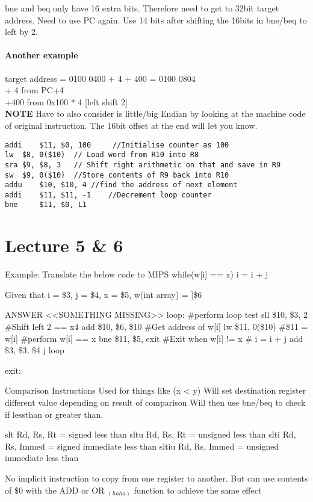 \documentclass{article}
\newcommand\tab[1][0.5cm]{\hspace*{#1}}
\begin{document}
	bne and beq only have 16 extra bits. Therefore need to get to 32bit target address. Need to use PC again. Use 14 bits after shifting the 16bits in bne/beq to left by 2.

	\paragraph{Another example}
	target address = 0100 0400 + 4  + 400 = 0100 0804 \\
	+ 4 from PC+4 \\
	+400 from 0x100 * 4 [left shift 2] \\
	\textbf{NOTE} Have to also consider is little/big Endian by looking at the machine code of original instruction. The 16bit offset at the end will let you know.

	\begin{lstlisting}
addi 	$11, $0, 100	 //Initialise counter as 100
lw 	$8, 0($10)	// Load word from R10 into R8
sra	$9, $8, 3	// Shift right arithmetic on that and save in R9
sw 	$9, 0($10)	//Store contents of R9 back into R10
addu 	$10, $10, 4	//find the address of next element
addi 	$11, $11, -1	//Decrement loop counter
bne 	$11, $0, L1
	\end{lstlisting}

\section{Lecture 5 \& 6}
	Example: Translate the below code to MIPS
		while(w[i] == x)
			i = i + j

		Given that i = \$3, j = \$4, x = \$5, w(int array) = ]\$6


		ANSWER
		<<SOMETHING MISSING>>
		loop: \#perform loop test
			sll \$10, \$3, 2 \tab \#Shift left 2 == x4
			add \$10, \$6, \$10 \tab \#Get address of w[i]
			lw \$11, 0(\$10) \tab \#\$11 = w[i]
			\#perform w[i] == x
			bne \$11, \$5, exit \tab \#Exit when w[i] != x
			\# i = i + j
			add \$3, \$3, \$4
			j loop

		exit:

	Comparison Instructions
		Used for things like (x < y)
		Will set destination register different value depending on result of comparison
		Will then use bne/beq to check if lessthan or greater than.

		slt Rd, Rs, Rt = signed less than
		sltu Rd, Rs, Rt = unsigned less than
		slti Rd, Rs, Immed  = signed immediate less than
		sltiu Rd, Rs, Immed  = unsigned immediate less than

		No implicit instruction to copy from one register to another. But can use contents of \$0 with the ADD or OR $_{(haha)}$ function to achieve the same effect
\end{document}
